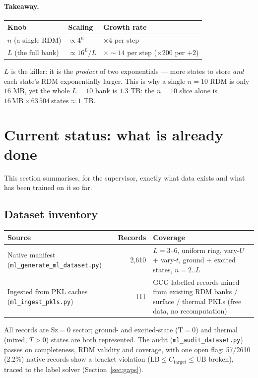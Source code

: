 \documentclass[11pt]{article}
\newcommand{\code}[1]{\texttt{\small #1}}
\begin{document}
\paragraph{Takeaway.}
\begin{center}
\begin{tabular}{@{}lll@{}}
\toprule
Knob & Scaling & Growth rate \\ \midrule
$n$ (a single RDM)   & $\propto 4^{n}$  & $\times4$ per step \\
$L$ (the full bank)  & $\propto 16^{L}/L$ & $\times{\sim}14$ per step ($\times200$ per ${+}2$) \\
\bottomrule
\end{tabular}
\end{center}
$L$ is the killer: it is the \emph{product} of two exponentials --- more states
to store \emph{and} each state's RDM exponentially larger. This is why a single
$n{=}10$ RDM is only $16$ MB, yet the whole $L{=}10$ bank is $1.3$ TB: the
$n{=}10$ slice alone is $16\,\text{MB}\times 63\,504\ \text{states}\approx 1$ TB.

\section{Current status: what is already done}\label{sec:status}
This section summarises, for the supervisor, exactly what data exists and what
has been trained on it so far.

\subsection{Dataset inventory}
\begin{center}
\begin{tabular}{@{}lrl@{}}
\toprule
Source & Records & Coverage \\
\midrule
Native manifest (\code{ml\_generate\_ml\_dataset.py}) & 2{,}610 &
  $L=3$--$6$, uniform ring, vary-$U$ + vary-$t$, ground + excited states,
  $n=2..L$ \\
Ingested from PKL caches (\code{ml\_ingest\_pkls.py}) & 111 &
  GCG-labelled records mined from existing RDM banks / surface / thermal PKLs
  (free data, no recomputation) \\
\bottomrule
\end{tabular}
\end{center}
All records are Sz$=0$ sector; ground- and excited-state (T$=0$) and thermal
(mixed, $T>0$) states are both represented. The audit (\code{ml\_audit\_dataset.py})
passes on completeness, RDM validity and coverage, with one open flag: 57/2610
(2.2\%) native records show a bracket violation
($\text{LB}\le C_{\text{target}}\le\text{UB}$ broken), traced to the label
solver (Section~\ref{sec:gaps}).
\end{document}
